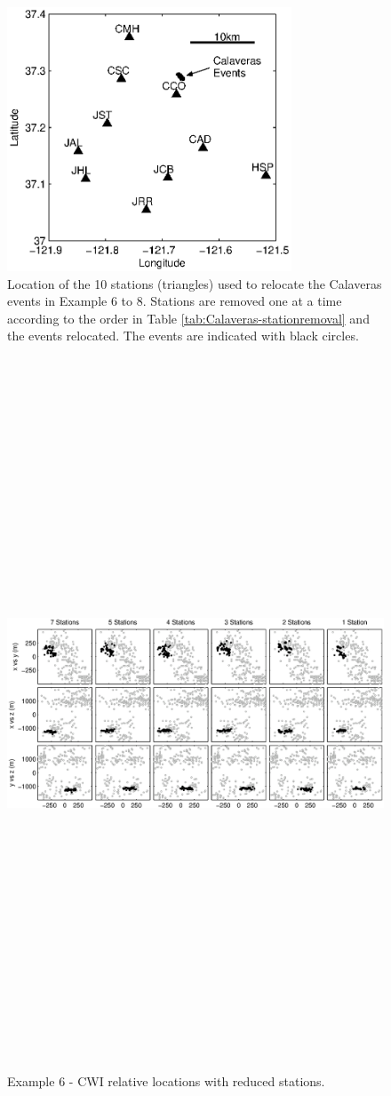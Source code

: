 \documentclass[extra, onecolumn, doublespacing]{gji}
\begin{document}
\begin{figure}
\noindent\includegraphics[width=20pc]{Figure7.eps} \caption{Location
of the 10 stations (triangles) used to relocate the Calaveras events
in Example 6 to 8. Stations are removed one at a time according to
the order in Table \ref{tab:Calaveras-stationremoval} and the events
relocated. The events are indicated with black circles.}
\label{fig:-eqopti-Calaveras-substations}
\end{figure}


\begin{figure}
\includegraphics[angle=90,height = 50pc]{Figure8_bw.eps}
\caption{Example 6 - CWI relative locations with reduced stations.}
\label{fig-CWIreducesstats}
\end{figure}
\end{document}
